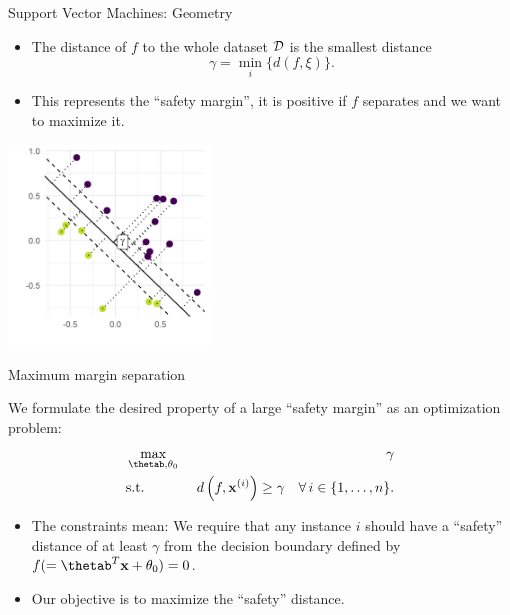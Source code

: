 \documentclass[11pt,compress,t,notes=noshow, xcolor=table]{beamer}
\begin{document}
\begin{vbframe}{Support Vector Machines: Geometry}
\framebreak

\begin{itemize}
    \item The distance of $f$ to the whole dataset $\mathcal{D}$
    is the smallest distance
    $$
    \gamma = \min\limits_i \Big\{ d \left(f, \xi \right) \Big\}.
    $$
    \item This represents the \enquote{safety margin}, it is positive if $f$ separates and we want to maximize it.
\end{itemize}


\begin{center}
\includegraphics[width=0.4\textwidth]{figure/svm_geometry.png} \\
\end{center}


\end{vbframe}

\begin{vbframe}{Maximum margin separation}

  We formulate the desired property of a large \enquote{safety margin} as an optimization problem:
  \begin{eqnarray*}
    & \max\limits_{\thetab, \theta_0} & \gamma \\
    & \text{s.t.} & \,\, d \left(f, \xi \right) \geq \gamma \quad \forall\, i \in \nset.
    \end{eqnarray*}

    \begin{itemize}
      \item The constraints mean: We require that any instance $i$ should have a \enquote{safety} distance of at least $\gamma$ from the decision boundary defined by $f (= \thetab^T \xv + \theta_0) = 0$.
      \item Our objective is to maximize the \enquote{safety} distance.
    \end{itemize}

\end{vbframe}
\end{document}
